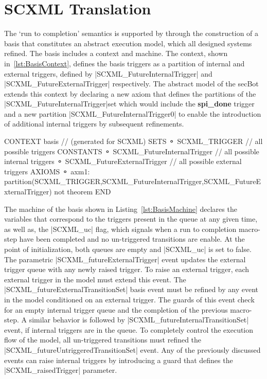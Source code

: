 \section{SCXML Translation}
\label{sec:translation}

The `run to completion' semantics is supported by \EventB through the construction of a basis that constitutes an 
abstract execution model, which all designed systems refined. The basis includes a \EventB context and machine. 
The context, shown in~\ref{lst:BasisContext}, defines the basis triggers as a partition of internal and external triggers, defined by |SCXML_FutureInternalTrigger| and |SCXML_FutureExternalTrigger| respectively. The abstract model of the secBot extends this context by declaring a new axiom that defines the partitions of the |SCXML_FutureInternalTrigger|set which would include the \textbf{spi\_done} trigger and a new partition |SCXML_FutureInternalTrigger0| to enable the introduction of additional internal triggers by subsequent refinements. 

\begin{EventBcode} 
	CONTEXT
		basis 	// (generated for SCXML)
	SETS
	⚬	SCXML_TRIGGER	 // all possible triggers
	CONSTANTS
	⚬	SCXML_FutureInternalTrigger	 // all possible internal triggers
	⚬	SCXML_FutureExternalTrigger	 // all possible external triggers
	AXIOMS
	⚬	axm1:	partition(SCXML_TRIGGER,SCXML_FutureInternalTrigger,SCXML_FutureExternalTrigger) not theorem 
	END
\end{EventBcode}

The machine of the basis shown in Listing~\ref{lst:BasisMachine} declares the variables that correspond to the triggers 
present in the queue at any given time, as well as, the |SCXML_uc| flag, which signals when a run to completion macro-step 
have been completed and no un-triggered transitions are enable. At the point of initialization, both queues are empty and
|SCXML_uc| is set to false. The parametric |SCXML_futureExternalTrigger| event updates the external trigger queue with any 
newly raised trigger. To raise an external trigger, each external trigger in the model must extend this event. 
The |SCXML_futureExternalTransitionSet| basis event must be refined by any event in the model conditioned on an external trigger. 
The guards of this event check for an empty internal trigger queue and the completion of the previous macro-step. 
A similar behavior is followed by |SCXML_futureInternalTransitionSet| event, if internal triggers are in the queue.  
To completely control the execution flow of the model, all un-triggered transitions must refined the |SCXML_futureUntriggeredTransitionSet|
event. Any of the previously discussed events can raise internal triggers by introducing a guard that defines the |SCXML_raisedTrigger| parameter.


